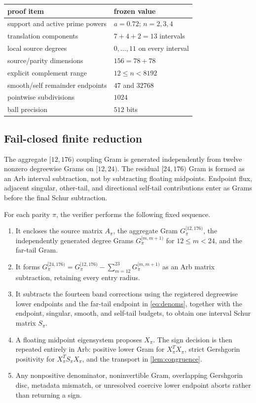 \documentclass[10pt]{article}
\begin{document}
\begin{center}
\begin{tabular}{@{}ll@{}}
\toprule
proof item & frozen value\\
\midrule
support and active prime powers & $a=0.72$; $n=2,3,4$\\
translation components & $7+4+2=13$ intervals\\
local source degrees & $0,\ldots,11$ on every interval\\
source/parity dimensions & $156=78+78$\\
explicit complement range & $12\le n<8192$\\
smooth/self remainder endpoints & $47$ and $32768$\\
pointwise subdivisions & $1024$\\
ball precision & $512$ bits\\
\bottomrule
\end{tabular}
\end{center}

\subsection{Fail-closed finite reduction}

The aggregate $[12,176)$ coupling Gram is generated independently from twelve
nonzero degreewise Grams on $[12,24)$.  The residual $[24,176)$ Gram is formed
as an Arb interval subtraction, not by subtracting floating midpoints.
Endpoint flux, adjacent
singular, other-tail, and directional self-tail contributions enter as Grams
before the final Schur subtraction.

For each parity $\pi$, the verifier performs the following fixed sequence.
\begin{enumerate}
\item It encloses the source matrix $A_\pi$, the aggregate Gram
$G_\pi^{[12,176)}$, the independently generated degree Grams
$G_\pi^{[m,m+1)}$ for $12\le m<24$, and the far-tail Gram.
\item It forms
$G_\pi^{[24,176)}=G_\pi^{[12,176)}-\sum_{m=12}^{23}G_\pi^{[m,m+1)}$
as an Arb matrix subtraction, retaining every entry radius.
\item It subtracts the fourteen band corrections using the registered
degreewise lower endpoints and the far-tail endpoint in
\eqref{eq:denoms}, together with the endpoint, singular, smooth, and self-tail
budgets, to obtain one interval Schur matrix $S_\pi$.
\item A floating midpoint eigensystem proposes $X_\pi$.  The sign decision is
then repeated entirely in Arb: positive lower Gram for $X_\pi^TX_\pi$,
strict Gershgorin positivity for $X_\pi^TS_\pi X_\pi$, and the transport in
\cref{lem:congruence}.
\item Any nonpositive denominator, noninvertible Gram, overlapping
Gershgorin disc, metadata mismatch, or unresolved coercive lower endpoint
aborts rather than returning a sign.
\end{enumerate}
\end{document}
